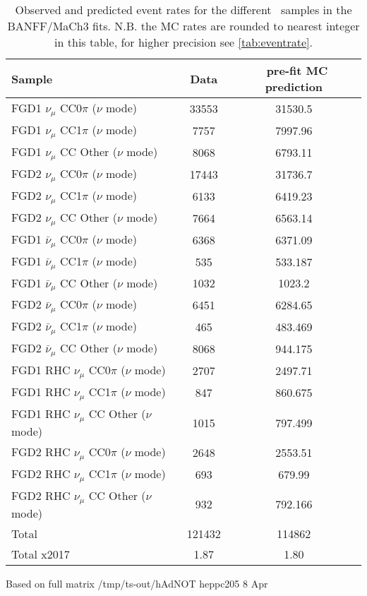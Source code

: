 \begin{table}[htbp]
	\centering
	\begin{tabular}{ l c c }
		\hline
		Sample & Data & \nd~pre-fit MC prediction \\ \hline
		\hline
		FGD1 $\nu_{\mu}$ CC0$\pi$ ($\nu$ mode)                  & 33553 & 31530.5    \\%
		FGD1 $\nu_{\mu}$ CC1$\pi$ ($\nu$ mode)                  & 7757  & 7997.96  \\%
		FGD1 $\nu_{\mu}$ CC Other ($\nu$ mode)                  & 8068  & 6793.11  \\%
		\hline
		FGD2 $\nu_{\mu}$ CC0$\pi$ ($\nu$ mode)                  & 17443 & 31736.7 \\%
		FGD2 $\nu_{\mu}$ CC1$\pi$ ($\nu$ mode)                  & 6133  & 6419.23  \\%
		FGD2 $\nu_{\mu}$ CC Other ($\nu$ mode)                  & 7664  & 6563.14  \\%
		\hline
		FGD1 $\bar{\nu}_{\mu}$ CC0$\pi$ ($\nu$ mode)            & 6368 & 6371.09    \\%
		FGD1 $\bar{\nu}_{\mu}$ CC1$\pi$ ($\nu$ mode)            & 535  & 533.187  \\%
		FGD1 $\bar{\nu}_{\mu}$ CC Other ($\nu$ mode)            & 1032 & 1023.2  \\%
		\hline
		FGD2 $\bar{\nu}_{\mu}$ CC0$\pi$ ($\nu$ mode)            & 6451 & 6284.65    \\%
		FGD2 $\bar{\nu}_{\mu}$ CC1$\pi$ ($\nu$ mode)            & 465  & 483.469  \\%
		FGD2 $\bar{\nu}_{\mu}$ CC Other ($\nu$ mode)            & 8068 & 944.175  \\%
		\hline
		FGD1 RHC $\nu_{\mu}$ CC0$\pi$ ($\nu$ mode)              & 2707 & 2497.71  \\%
		FGD1 RHC $\nu_{\mu}$ CC1$\pi$ ($\nu$ mode)              & 847  & 860.675 \\%
		FGD1 RHC $\nu_{\mu}$ CC Other ($\nu$ mode)              & 1015 & 797.499  \\%
		\hline
		FGD2 RHC $\nu_{\mu}$ CC0$\pi$ ($\nu$ mode)              & 2648 & 2553.51  \\%
		FGD2 RHC $\nu_{\mu}$ CC1$\pi$ ($\nu$ mode)              & 693  & 679.99  \\%
		FGD2 RHC $\nu_{\mu}$ CC Other ($\nu$ mode)              & 932  & 792.166 \\%
		Total & 121432 & 114862 \\
		Total x2017 & 1.87 & 1.80 \\
		\hline
	\end{tabular}
	\caption{Observed and predicted event rates for the different \nd~samples in the BANFF/MaCh3 fits. N.B. the MC rates are rounded to nearest integer in this table, for higher precision see \autoref{tab:eventrate}.}
	\label{tab:detailed_eventrate_2018}
\end{table}
Based on full matrix /tmp/ts-out/hAdNOT heppc205 8 Apr


